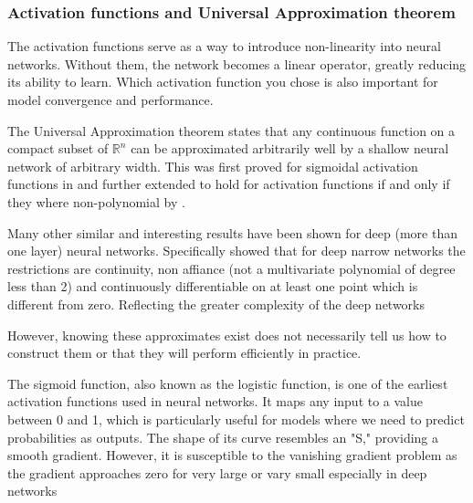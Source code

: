 \documentclass{article}
\theoremstyle{definition}
\begin{document}

\subsubsection{Activation functions and Universal Approximation theorem}
The activation functions serve as a way to introduce non-linearity into neural networks. Without them, the network becomes a linear operator, greatly reducing its ability to learn.  Which  activation function you chose is also important for model convergence and performance.

The Universal Approximation theorem states that any continuous function on a compact subset of $\mathbb{R}^{n}$ can be approximated arbitrarily well by a shallow neural network of arbitrary width. This was first proved for sigmoidal activation functions in  \textcite{universalapprox} and further extended to hold for activation functions if and only if they where non-polynomial by \textcite{pinkus_1999}. 

Many other similar and interesting results have been shown for deep (more than one layer) neural networks. Specifically \textcite{kidger2020universal} showed that for  deep narrow networks the restrictions are continuity, non affiance (not a multivariate polynomial of degree less than 2) and continuously differentiable on at least one point which is different from zero. Reflecting the greater complexity of the deep networks

However, knowing these approximates exist does not necessarily tell us how to construct them or that they will perform efficiently in practice.

The sigmoid function, also known as the logistic function, is one of the earliest activation functions used in neural networks. It maps any input to a value between 0 and 1, which is particularly useful for models where we need to predict probabilities as outputs. The shape of its curve resembles an "S," providing a smooth gradient.  However, it is susceptible to the vanishing gradient problem as the gradient approaches zero for very large or vary small especially in deep networks
\end{document}
